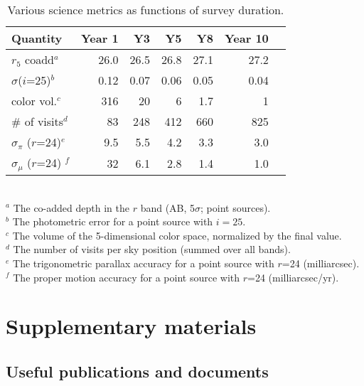 \documentclass[DM,lsstdraft,toc,usenatbib]{lsstdoc}
\begin{document}
\begin{table}
\caption{Various science metrics as functions of survey duration.}
\begin{tabular}{|l|r|r|r|r|r|r|}
\hline     
          Quantity                          &     Year 1   &    Y3  &     Y5  &     Y8   &     Year 10   \\
\hline  
    $r_5$ coadd$^a$                   &       26.0    &      26.5   &      26.8    &      27.1    &          27.2     \\
    $\sigma$($i$=25)$^b$         &     0.12    &     0.07    &      0.06    &    0.05      &        0.04        \\     
    color vol.$^c$                        &       316     &       20     &        6      &    1.7        &           1       \\
     \# of visits$^d$                    &          83     &     248     &      412     &    660      &          825      \\  
    $\sigma_\pi$ ($r$=24)$^e$   &        9.5     &      5.5     &        4.2    &     3.3       &          3.0      \\ 
    $\sigma_\mu$ ($r$=24) $^f$  &  32   &      6.1    &     2.8   &     1.4   &     1.0     \\
\hline                         
\end{tabular}
\\ \vskip 0.05in
$^a$ The co-added depth in the $r$ band (AB, 5$\sigma$; point sources).  \\
$^b$ The photometric error for a point source with $i=25$. \\
$^c$ The volume of the 5-dimensional color space, normalized by the final value. \\
$^d$ The number of visits per sky position (summed over all bands). \\
$^e$ The trigonometric parallax accuracy for a point source with $r$=24 (milliarcsec). \\ 
$^f$  The proper motion accuracy for a point source with $r$=24 (milliarcsec/yr).  \\
\end{table}



\section{Supplementary materials} 
\label{append:supplemental}

\subsection{Useful publications and documents \label{sec:pubs}}
\end{document}
